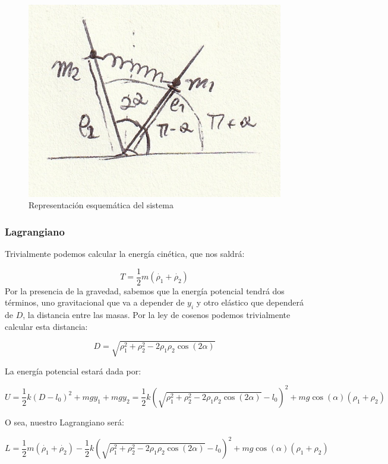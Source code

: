 \documentclass[a4paper,12pt]{article}
\begin{document}
\begin{figure}[h!]
  \centering
  \caption{Representación esquemática del sistema}
  \label{repr}
  \includegraphics{repr.jpg}
\end{figure}

\subsubsection{Lagrangiano}
Trivialmente podemos calcular la energía cinética, que nos saldrá:

\begin{equation}
  T = \frac{1}{2}m (\dot{\rho_1} + \dot{\rho_2})
\end{equation}
Por la presencia de la gravedad, sabemos que la energía potencial tendrá dos términos, uno gravitacional que va a depender de $y_i$ y otro elástico que dependerá de $D$, la distancia entre las masas. Por la ley de cosenos podemos trivialmente calcular esta distancia:

$$D =\sqrt{\rho_1^2 + \rho_2^2 -2\rho_1\rho_2\cos{(2\alpha)}} $$


La energía potencial estará dada por:

$$U = \frac{1}{2}k(D-l_0)^2 + mgy_1+mgy_2 = \frac{1}{2}k \left(\sqrt{\rho_1^2 + \rho_2^2 -2\rho_1\rho_2\cos{(2\alpha)}} - l_0\right)^2 + mg\cos{(\alpha)}\left(\rho_1+\rho_2\right)$$




O sea, nuestro Lagrangiano será:

\begin{equation}
  L = \frac{1}{2}m (\dot{\rho_1} + \dot{\rho_2}) - \frac{1}{2}k (\sqrt{\rho_1^2 + \rho_2^2 -2\rho_1\rho_2\cos{(2\alpha)}} - l_0)^2 + mg\cos{(\alpha)}\left(\rho_1+\rho_2\right)
\end{equation}
\end{document}
